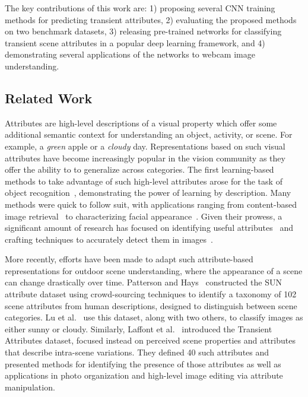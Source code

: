 \documentclass[10pt,twocolumn,letterpaper]{article}
\newcommand{\todo}[1]{\textcolor{red}{todo: {\em #1}}}
\begin{document}


The key contributions of this work are: 1) proposing several CNN
training methods for predicting transient attributes, 2) evaluating
the proposed methods on two benchmark datasets, 3) releasing
pre-trained networks for classifying transient scene attributes in a
popular deep learning framework, and 4) demonstrating several
applications of the networks to webcam image understanding. 

\subsection{Related Work}
Attributes are high-level descriptions of a visual property which offer some
additional semantic context for understanding an object, activity, or scene.
For example, a \emph{green} apple or a \emph{cloudy} day. Representations based
on such visual attributes have become increasingly popular in the vision
community as they offer the ability to to generalize across categories. The
first learning-based methods to take advantage of such high-level attributes
arose for the task of object
recognition~\cite{farhadi2009describing,lampert2009learning}, demonstrating the
power of learning by description. Many methods were quick to follow suit, with
applications ranging from content-based image
retrieval~\cite{siddiquie2011image} to characterizing facial
appearance~\cite{kumar2011describable}. Given their prowess, a significant
amount of research has focused on identifying useful
attributes~\cite{berg2010automatic} and crafting techniques to accurately
detect them in images~\cite{vedaldi2014understanding}. 

More recently, efforts have been made to adapt such attribute-based
representations for outdoor scene understanding, where the appearance of a
scene can change drastically over time.  Patterson and
Hays~\cite{patterson2012sun} constructed the SUN attribute dataset using
crowd-sourcing techniques to identify a taxonomy of 102 scene attributes from
human descriptions, designed to distinguish between scene categories. Lu et
al.~\cite{lutwoclass} use this dataset, along with two others, to classify
images as either sunny or cloudy.  Similarly, Laffont et al.~\cite{Laffont14}
introduced the Transient Attributes dataset, focused instead on perceived scene
properties and attributes that describe intra-scene variations. They defined 40
such attributes and presented methods for identifying the presence of those
attributes as well as applications in photo organization and high-level image
editing via attribute manipulation. 
\end{document}
